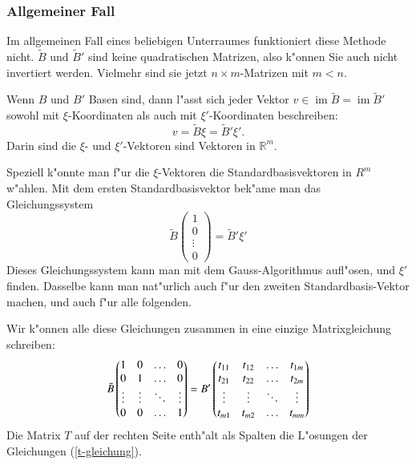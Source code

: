 \subsubsection{Allgemeiner Fall}
Im allgemeinen Fall eines beliebigen Unterraumes funktioniert diese
Methode nicht. $\tilde B$ und $\tilde B'$ sind keine quadratischen
Matrizen, also k"onnen Sie auch nicht invertiert werden. Vielmehr
sind sie jetzt $n\times m$-Matrizen mit $m<n$.

Wenn $B$ und $B'$ Basen sind, dann l"asst sich jeder Vektor $v\in
\operatorname{im}\tilde B=\operatorname{im}\tilde B'$ 
sowohl mit $\xi$-Koordinaten als auch mit $\xi'$-Koordinaten
beschreiben:
\[
v=\tilde B\xi=\tilde B'\xi'.
\]
Darin sind die $\xi$- und $\xi'$-Vektoren sind Vektoren in $\mathbb R^m$.

Speziell k"onnte man f"ur die $\xi$-Vektoren die Standardbasisvektoren
in $R^m$ w"ahlen. Mit dem ersten Standardbasisvektor bek"ame man
das Gleichungssystem
\begin{equation}
\tilde B\begin{pmatrix} 1\\0\\\vdots\\0\end{pmatrix}
=\tilde B'\xi'
\label{t-gleichung}
\end{equation}
Dieses Gleichungssystem kann man mit dem Gauss-Algorithmus aufl"osen,
und $\xi'$ finden. Dasselbe kann man nat"urlich auch f"ur den
zweiten Standardbasis-Vektor machen, und auch f"ur alle folgenden.

Wir k"onnen alle diese Gleichungen zusammen in eine einzige
Matrixgleichung schreiben:
\[
\tilde B\begin{pmatrix}
1&0&\dots&0\\
0&1&\dots&0\\
\vdots&\vdots&\ddots&\vdots\\
0&0&\dots&1
\end{pmatrix}
=B'\begin{pmatrix}
\mathstrut t_{11}&t_{12}&\dots&t_{1m}\\
\mathstrut t_{21}&t_{22}&\dots&t_{2m}\\
\mathstrut \vdots&\vdots&\ddots&\vdots\\
\mathstrut t_{m1}&t_{m2}&\dots&t_{mm}\\
\end{pmatrix}
\]
Die Matrix $T$ auf der rechten Seite enth"alt als Spalten
die L"osungen der Gleichungen (\ref{t-gleichung}).

